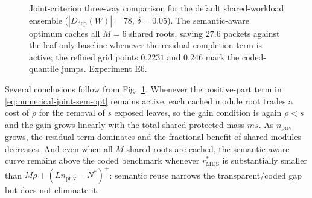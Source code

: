 \documentclass[journal]{IEEEtran}
\numberwithin{equation}{section}
\begin{document}
\begin{figure}[t]
\centering
{}
\caption{Joint-criterion three-way comparison for the default
shared-workload ensemble (\(|D_{\mathrm{dep}}(W)|=78\), \(\delta=0.05\)).
The semantic-aware optimum caches all \(M=6\) shared roots, saving
\(27.6\) packets against the leaf-only baseline whenever the residual
completion term is active; the refined grid points \(0.2231\) and
\(0.246\) mark the coded-quantile jumps.  Experiment E6.}
\label{fig:workload-joint}
\end{figure}

Several conclusions follow from Fig.~\ref{fig:workload-joint}.  Whenever
the positive-part term in \eqref{eq:numerical-joint-sem-opt} remains
active, each cached module root trades a cost of \(\rho\) for the removal
of \(s\) exposed leaves, so the gain condition is again \(\rho<s\) and the
gain grows linearly with the total shared protected mass \(ms\).  As
\(n_{\mathrm{priv}}\) grows, the residual term dominates and the fractional
benefit of shared modules decreases.  And even when all \(M\) shared roots
are cached, the semantic-aware curve remains above the coded benchmark
whenever \(r_{\mathrm{MDS}}^{*}\) is substantially smaller than
\(M\rho+(Ln_{\mathrm{priv}}-N^{*})^{+}\): semantic reuse narrows the
transparent/coded gap but does not eliminate it.
\end{document}
